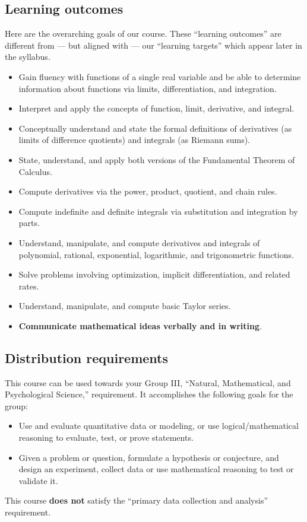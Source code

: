 \documentclass[11pt,twoside]{amsart}
\begin{document}
\subsection*{Learning outcomes}
Here are the overarching goals of our course. These ``learning outcomes'' are different from --- but aligned with --- our ``learning targets'' which appear later in the syllabus.
\begin{itemize}
\item Gain fluency with functions of a single real variable and be able to determine information about functions via limits, differentiation, and integration.
\item Interpret and apply the concepts of function, limit, derivative, and integral.
\item Conceptually understand and state the formal definitions of derivatives (as limits of difference quotients) and integrals (as Riemann sums).
\item State, understand, and apply both versions of the Fundamental Theorem of Calculus.
\item Compute derivatives via the power, product, quotient, and chain rules.
\item Compute indefinite and definite integrals via substitution and integration by parts.
\item Understand, manipulate, and compute derivatives and integrals of polynomial, rational, exponential, logarithmic, and trigonometric functions.
\item Solve problems involving optimization, implicit differentiation, and related rates.
\item Understand, manipulate, and compute basic Taylor series.
\item \textbf{Communicate mathematical ideas verbally and in writing}.
\end{itemize}

\subsection*{Distribution requirements}
This course can be used towards your Group III, ``Natural, Mathematical, and Psychological Science,'' requirement.  It accomplishes the following goals for the group:
\begin{itemize}
\item Use and evaluate quantitative data or modeling, or use logical/mathematical reasoning to evaluate, test, or prove statements.
\item Given a problem or question, formulate a hypothesis or conjecture, and design an experiment, collect data or use mathematical reasoning to test or validate it.
\end{itemize}
This course \textbf{does not} satisfy the ``primary data collection and analysis'' requirement.
\end{document}
